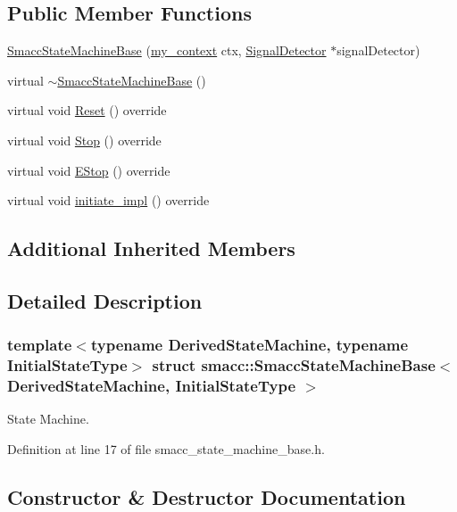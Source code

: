 \subsection*{Public Member Functions}
\begin{DoxyCompactItemize}
\item 
\hyperlink{structsmacc_1_1SmaccStateMachineBase_a47508a2d301007546d4c70dedd2ade4b}{Smacc\+State\+Machine\+Base} (\hyperlink{common_8h_af2dcacead80d69b96952496fe413bbfe}{my\+\_\+context} ctx, \hyperlink{classsmacc_1_1SignalDetector}{Signal\+Detector} $\ast$signal\+Detector)
\item 
virtual \hyperlink{structsmacc_1_1SmaccStateMachineBase_af08edc30fb749631b5459eb7438129ec}{$\sim$\+Smacc\+State\+Machine\+Base} ()
\item 
virtual void \hyperlink{structsmacc_1_1SmaccStateMachineBase_a150ec7ab023a6d1d028387b2da907e9d}{Reset} () override
\item 
virtual void \hyperlink{structsmacc_1_1SmaccStateMachineBase_a9c7c7b8d814a8cb1b741c7675dc2a9f7}{Stop} () override
\item 
virtual void \hyperlink{structsmacc_1_1SmaccStateMachineBase_af1d145820c98089389e7de97a6744231}{E\+Stop} () override
\item 
virtual void \hyperlink{structsmacc_1_1SmaccStateMachineBase_a2dc1cd9a25b80f00602f1faab9b01e7b}{initiate\+\_\+impl} () override
\end{DoxyCompactItemize}
\subsection*{Additional Inherited Members}


\subsection{Detailed Description}
\subsubsection*{template$<$typename Derived\+State\+Machine, typename Initial\+State\+Type$>$\newline
struct smacc\+::\+Smacc\+State\+Machine\+Base$<$ Derived\+State\+Machine, Initial\+State\+Type $>$}

State Machine. 

Definition at line 17 of file smacc\+\_\+state\+\_\+machine\+\_\+base.\+h.



\subsection{Constructor \& Destructor Documentation}
\mbox{\label{structsmacc_1_1SmaccStateMachineBase_a47508a2d301007546d4c70dedd2ade4b}} 
